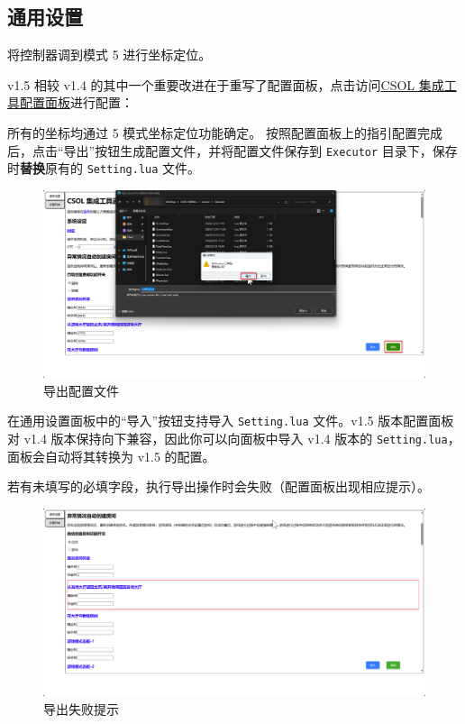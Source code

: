 \subsection{通用设置}

将控制器调到模式 5 进行坐标定位。

v1.5 相较 v1.4 的其中一个重要改进在于重写了配置面板，点击访问\href{https://macrohard.fun/CSOL-Utilities/ConfigPanel}{CSOL 集成工具配置面板}进行配置：

所有的坐标均通过 5 模式坐标定位功能确定。
按照配置面板上的指引配置完成后，点击“导出”按钮生成配置文件，并将配置文件保存到 \lstinline{Executor} 目录下，保存时\textbf{\color{red}替换}原有的 \lstinline{Setting.lua} 文件。

\begin{figure}[H]
    \Centering
    \includegraphics[width=\textwidth]{documents/assets/export_setting}
    \caption{导出配置文件}
    \label{ch2fig-export-setting}
\end{figure}

在通用设置面板中的“导入”按钮支持导入 \lstinline{Setting.lua} 文件。v1.5 版本配置面板对 v1.4 版本保持向下兼容，因此你可以向面板中导入 v1.4 版本的 \lstinline{Setting.lua}，面板会自动将其转换为 v1.5 的配置。

若有未填写的必填字段，执行导出操作时会失败（配置面板出现相应提示）。

\begin{figure}[H]
    \Centering
    \includegraphics[width=\textwidth]{documents/assets/export_error}
    \caption{导出失败提示}
\end{figure}

